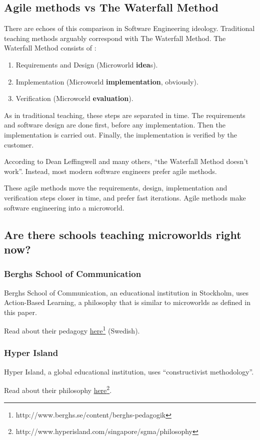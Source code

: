 \subsection{Agile methods vs The Waterfall Method}

There are echoes of this comparison in Software Engineering ideology.
Traditional teaching methods arguably correspond with The Waterfall
Method. The Waterfall Method consists of \cite{wiki:waterfall}: 

\begin{enumerate}
\item Requirements and Design (Microworld \textbf{idea}s). 
\item Implementation (Microworld \textbf{implementation}, obviously). 
\item Verification (Microworld \textbf{evaluation}).
\end{enumerate}

As in traditional teaching, these steps are separated in time. The
requirements and software design are done first, before any
implementation. Then the implementation is carried out. Finally, the
implementation is verified by the customer.

According to Dean Leffingwell and many others, ``the Waterfall Method
doesn't work''\cite{leffingwell}. Instead, most modern software engineers
prefer agile methods.

These agile methods move the requirements, design, implementation and
verification steps closer in time, and prefer fast iterations. Agile
methods make software engineering into a microworld.

\subsection{Are there schools teaching microworlds right now?}

\subsubsection{Berghs School of Communication}

Berghs School of Communication, an educational institution in Stockholm, uses Action-Based Learning, a philosophy that is similar to microworlds as defined in this paper.

Read about their pedagogy \href{http://www.berghs.se/content/berghs-pedagogik}{here}\footnote{http://www.berghs.se/content/berghs-pedagogik} (Swedish). 

\subsubsection{Hyper Island}

Hyper Island, a global educational institution, uses ``constructivist methodology''.

Read about their philosophy \href{http://www.hyperisland.com/singapore/sgma/philosophy}{here}\footnote{http://www.hyperisland.com/singapore/sgma/philosophy}.
